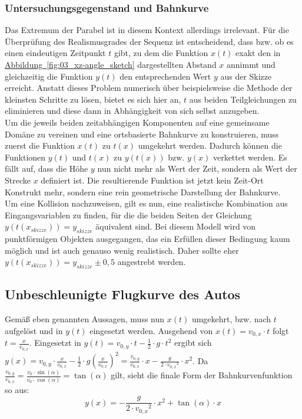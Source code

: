 \subsubsection{Untersuchungsgegenstand und Bahnkurve}
Das Extremum der Parabel ist in diesem Kontext allerdings irrelevant. Für die Überprüfung des Realismusgrades der Sequenz ist entscheidend, dass bzw. ob es einen eindeutigen Zeitpunkt $t$ gibt, zu dem die Funktion $x(t)$ exakt den in \hyperref[fig:03_xz-angle_sketch]{Abbildung~\ref*{fig:03_xz-angle_sketch}} dargestellten Abstand $x$ annimmt und gleichzeitig die Funktion $y(t)$ den entsprechenden Wert $y$ aus der Skizze erreicht.
Anstatt dieses Problem numerisch über beispielsweise die Methode der kleinsten Schritte zu lösen, bietet es sich hier an, $t$ aus beiden Teilgleichungen zu eliminieren und diese dann in Abhängigkeit von sich selbst anzugeben. \\
Um die jeweils beiden zeitabhängigen Komponenten auf eine gemeinsame Domäne zu vereinen und eine ortsbasierte Bahnkurve zu konstruieren, muss zuerst die Funktion $x(t)$ zu $t(x)$ umgekehrt werden. Dadurch können die Funktionen $y(t)$ und $t(x)$ zu $y(t(x))$ bzw. $y(x)$ verkettet werden. Es fällt auf, dass die Höhe $y$ nun nicht mehr als Wert der Zeit, sondern als Wert der Strecke $x$ definiert ist. Die resultierende Funktion ist jetzt kein Zeit-Ort Konstrukt mehr, sondern eine rein geometrische Darstellung der Bahnkurve.
\\
Um eine Kollision nachzuweisen, gilt es nun, eine realistische Kombination aus Eingangsvariablen zu finden, für die die beiden Seiten der Gleichung $y(t(x_{skizze}))=y_{skizze}$ äquivalent sind. Bei diesem Modell wird von punktförmigen Objekten ausgegangen, das ein Erfüllen dieser Bedingung kaum möglich und ist auch genauso wenig realistisch. Daher sollte eher $y(t(x_{skizze}))=y_{skizze}\pm 0,5$ angestrebt werden.


\subsection{Unbeschleunigte Flugkurve des Autos}
Gemäß eben genannten Aussagen, muss nun $x(t)$ umgekehrt, bzw. nach $t$ aufgelöst und in $y(t)$ eingesetzt werden. Ausgehend von $x(t) = v_{0,x}\cdot t$ folgt $t = \tfrac{x}{v_{0,x}}$. Eingesetzt in $y(t) = v_{0,y}\cdot t - \tfrac{1}{2}\cdot g\cdot t^2$ ergibt sich 
$y(x) = v_{0,y}\cdot\tfrac{x}{v_{0,x}} - \tfrac{1}{2}\cdot g \left( \tfrac{x}{v_{0,x}} \right)^2 
= \tfrac{v_{0,y}}{v_{0,x}}\cdot x - \tfrac{g}{2\cdot{v_{0,x}}^{2}}\cdot x^{2}$. 
Da $\tfrac{v_{0,y}}{v_{0,x}} = \tfrac{v_{0}\cdot\sin(\alpha)}{v_{0}\cdot\cos(\alpha)} = \tan(\alpha)$ gilt, 
sieht die finale Form der Bahnkurvenfunktion so aus: 
\[
y(x) = -\frac{g}{2\cdot{v_{0,x}}^{2}}\cdot x^{2} + \tan(\alpha)\cdot x
\]


